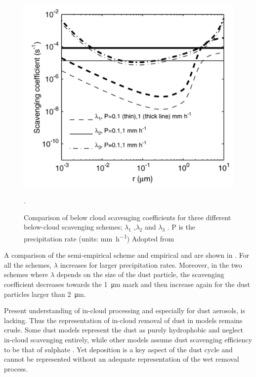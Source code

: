 \begin{figure}[htpb]
    \centering
    \includegraphics[draft=False,scale=.5]{texfiles/figs/Scavenging.PNG}
    \caption{Comparison of below cloud scavenging coefficients for three different below-cloud scavenging schemes; $\lambda_1$ \textcite{jung2006intercomparison},$\lambda_2$ \textcite{brandt2002modelling} and $\lambda_3$ \textcite{laakso2003ultrafine}. 
    P is the precipitation rate (units: \si{\mm\per\hour}) 
    Adopted from \textcite{jung2006intercomparison}}.
    \label{fig:scavenging}
\end{figure}
A comparison of the semi-empirical \textcite{ShaoYaping2008PaMo} scheme and empirical \textcite{brandt2002modelling} and \textcite{laakso2003ultrafine} are shown in . For all the schemes, $\lambda$ increases for larger precipitation rates. Moreover, in the two schemes where $\lambda$ depends on the size of the dust particle, the scavenging coefficient decreases towards the \SI{1}{\micro\metre} mark and then increase again for the dust particles larger than \SI{2}{\micro\metre}. 

Present understanding of in-cloud processing and especially for dust aerosols, is lacking. 
Thus the representation of in-cloud removal of dust in models remains crude. Some dust models represent the dust as purely hydrophobic and neglect in-cloud scavenging entirely, while other models assume dust scavenging efficiency to be that of sulphate \parencite{bergametti2014dust}. 
Yet deposition is a key aspect of the dust cycle and cannot be represented without an adequate representation of the wet removal process.
